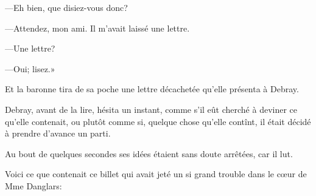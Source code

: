 —Eh bien, que disiez-vous donc? 

—Attendez, mon ami. Il m'avait laissé une lettre. 

—Une lettre? 

—Oui; lisez.» 

Et la baronne tira de sa poche une lettre décachetée qu'elle présenta à Debray. 

Debray, avant de la lire, hésita un instant, comme s'il eût cherché à deviner ce qu'elle contenait, ou plutôt comme si, quelque chose qu'elle contînt, il était décidé à prendre d'avance un parti. 

Au bout de quelques secondes ses idées étaient sans doute arrêtées, car il lut. 

Voici ce que contenait ce billet qui avait jeté un si grand trouble dans le cœur de Mme Danglars: 

